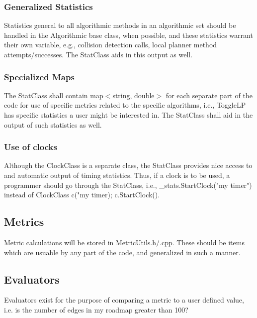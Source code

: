 \documentclass[12pt]{article}
\begin{document}
\subsubsection{Generalized Statistics}
Statistics general to all algorithmic methods in an algorithmic set should be handled in the Algorithmic base class,
when possible, and these statistics warrant their own variable, e.g., collision detection calls, local planner method
attempts/successes. The StatClass aids in this output as well.

\subsubsection{Specialized Maps}
The StatClass shall contain map$<$string, double$>$ for each separate part of the code for use of specific metrics related
to the specific algorithms, i.e., ToggleLP has specific statistics a user might be interested in. The StatClass shall
aid in the output of such statistics as well.

\subsubsection{Use of clocks}
Although the ClockClass is a separate class, the StatClass provides nice access to and automatic output of timing
statistics. Thus, if a clock is to be used, a programmer should go through the StatClass, i.e., \_stats.StartClock("my
timer") instead of ClockClass c("my timer); c.StartClock(). 

\subsection{Metrics}
Metric calculations will be stored in MetricUtils.h/.cpp. These should be items which are usuable by any part of the
code, and generalized in such a manner. 

\subsection{Evaluators}
Evaluators exist for the purpose of comparing a metric to a user defined value, i.e. is the number of edges in my
roadmap greater than 100?

\end{document}

